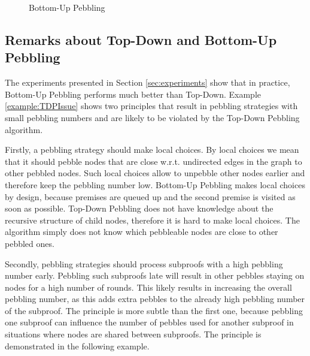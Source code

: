\begin{example}
\begin{figure}[tb]
{\begin{minipage}{0.25\textwidth}
		\end{minipage}%
			}
		\caption{Bottom-Up Pebbling}
		\label{fig:BUP}
\end{figure}
\label{example:BUP}
\end{example}



\subsection{Remarks about Top-Down and Bottom-Up Pebbling} %
\label{sec:TDvsBU}

The experiments presented in Section \ref{sec:experiments} show that in practice, Bottom-Up Pebbling performs much better than Top-Down.
Example \ref{example:TDPIssue} shows two principles that result in pebbling strategies with small pebbling numbers and are likely to be violated by the Top-Down Pebbling algorithm.

Firstly, a pebbling strategy should make local choices.
By local choices we mean that it should pebble nodes that are close w.r.t. undirected edges in the graph to other pebbled nodes.
Such local choices allow to unpebble other nodes earlier and therefore keep the pebbling number low.
Bottom-Up Pebbling makes local choices by design, because premises are queued up and the second premise is visited as soon as possible.
Top-Down Pebbling does not have knowledge about the recursive structure of child nodes, therefore it is hard to make local choices.
The algorithm simply does not know which pebbleable nodes are close to other pebbled ones.

Secondly, pebbling strategies should process subproofs with a high pebbling number early.
Pebbling such subproofs late will result in other pebbles staying on nodes for a high number of rounds.
This likely results in increasing the overall pebbling number, as this adds extra pebbles to the already high pebbling number of the subproof.
The principle is more subtle than the first one, because pebbling one subproof can influence the number of pebbles used for another subproof in situations where nodes are shared between subproofs.
The principle is demonstrated in the following example.

